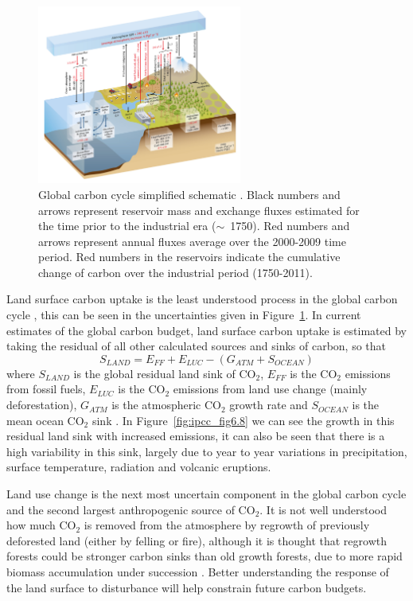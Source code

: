 \documentclass[11pt]{article}
\begin{document}
\begin{figure}[ht]
    \centering
    \includegraphics[width=0.6\textwidth]{ipcc_fig6_1.jpg}
    \caption{Global carbon cycle simplified schematic \citep{ciais2014carbon}. Black numbers and arrows represent reservoir mass and exchange fluxes estimated for the time prior to the industrial era (\(\sim\)~1750). Red numbers and arrows represent annual fluxes average over the 2000-2009 time period. Red numbers in the reservoirs indicate the cumulative change of carbon over the industrial period (1750-2011).}
    \label{fig:ipcc_fig6.1}
\end{figure}

Land surface carbon uptake is the least understood process in the global carbon cycle \citep{ciais2014carbon}, this can be seen in the uncertainties given in Figure~\ref{fig:ipcc_fig6.1}. In current estimates of the global carbon budget, land surface carbon uptake is estimated by taking the residual of all other calculated sources and sinks of carbon, so that
\begin{equation}
S_{LAND} = E_{FF} + E_{LUC} - (G_{ATM} + S_{OCEAN})
\end{equation}  
where \(S_{LAND}\) is the global residual land sink of CO\(_{2}\), \(E_{FF}\) is the CO\(_{2}\) emissions from fossil fuels, \(E_{LUC}\) is the CO\(_{2}\) emissions from land use change (mainly deforestation), \(G_{ATM}\) is the atmospheric CO\(_{2}\) growth rate and \(S_{OCEAN}\) is the mean ocean CO\(_{2}\) sink \citep{le2015global}. In Figure~\ref{fig:ipcc_fig6.8} we can see the growth in this residual land sink with increased emissions, it can also be seen that there is a high variability in this sink, largely due to year to year variations in precipitation, surface temperature, radiation and volcanic eruptions.

Land use change is the next most uncertain component in the global carbon cycle and the second largest anthropogenic source of CO\(_{2}\). It is not well understood how much CO\(_{2}\) is removed from the atmosphere by regrowth of previously deforested land (either by felling or fire), although it is thought that regrowth forests could be stronger carbon sinks than old growth forests, due to more rapid biomass accumulation under succession \citep{pan2011large}. Better understanding the response of the land surface to disturbance will help constrain future carbon budgets. 
\end{document}
